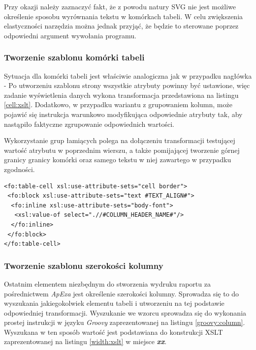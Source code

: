 \documentclass[11pt,a4paper]{article}
\begin{document}
Przy okazji należy zaznaczyć fakt, że z powodu natury SVG nie jest możliwe określenie sposobu wyrównania tekstu w komórkach tabeli. W celu zwiększenia elastyczności narzędzia można jednak przyjąć, że będzie to sterowane poprzez odpowiedni argument wywołania programu.

\subsubsection{Tworzenie szablonu komórki tabeli}
Sytuacja dla komórki tabeli jest właściwie analogiczna jak w przypadku nagłówka - Po utworzeniu szablonu strony wszystkie atrybuty powinny być ustawione, więc zadanie wyświetlenia danych wykona transformacja przedstawiona na listingu \ref{cell:xslt}. Dodatkowo, w przypadku wariantu z grupowaniem kolumn, może pojawić się instrukcja warunkowo modyfikująca odpowiednie atrybuty tak, aby nastąpiło faktyczne zgrupowanie odpowiednich wartości.

Wykorzystanie grup łamiących polega na dołączeniu transformacji testującej wartość atrybutu w poprzednim wierszu, a także pomijającej tworzenie górnej granicy granicy komórki oraz samego tekstu w niej zawartego w przypadku zgodności.

\lstset{language=XSLT}
\begin{lstlisting}[frame=single,caption=Transformacja dla komórki tabeli, label=cell:xslt]
<fo:table-cell xsl:use-attribute-sets="cell border">
 <fo:block xsl:use-attribute-sets="text #TEXT_ALIGN#">
  <fo:inline xsl:use-attribute-sets="body-font">
   <xsl:value-of select=".//#COLUMN_HEADER_NAME#"/>
  </fo:inline>
 </fo:block>
</fo:table-cell>

\end{lstlisting}


\subsubsection{Tworzenie szablonu szerokości kolumny}
Ostatnim elementem niezbędnym do stworzenia wydruku raportu za pośrednictwem \emph{ApExa} jest określenie szerokości kolumny. Sprowadza się to do wyszukania jakiegokolwiek elementu tabeli i utworzeniu na tej podstawie odpowiedniej transformacji. Wyszukanie we wzorcu sprowadza się do wykonania prostej instrukcji w języku \emph{Groovy} zaprezentowanej na listingu \ref{groovy:column}. Wyszukana w ten sposób wartość jest podstawiana do konstrukcji XSLT zaprezentowanej na listingu \ref{width:xslt} w miejsce \textbf{\emph{xx}}.
\end{document}
